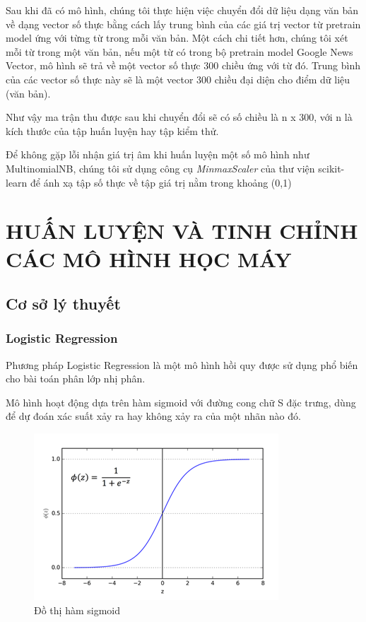 \documentclass[12pt,a4paper,oneside]{book}
\begin{document}
	Sau khi đã có mô hình, chúng tôi thực hiện việc chuyển đổi dữ liệu dạng văn bản về dạng vector số thực bằng cách lấy trung bình của các giá trị vector từ pretrain model ứng với từng từ trong mỗi văn bản. Một cách chi tiết hơn, chúng tôi xét mỗi từ trong một văn bản, nếu một từ có trong bộ pretrain model Google News Vector, mô hình sẽ trả về một vector số thực 300 chiều ứng với từ đó. Trung bình của các vector số thực này sẽ là một vector 300 chiều đại diện cho điểm dữ liệu (văn bản).
	
	Như vậy ma trận thu được sau khi chuyển đổi sẽ có số chiều là n x 300, với n là kích thước của tập huấn luyện hay tập kiểm thử.
	
	Để không gặp lỗi nhận giá trị âm khi huấn luyện một số mô hình như MultinomialNB, chúng tôi sử dụng công cụ \textit{MinmaxScaler} của thư viện scikit-learn để ánh xạ tập số thực về tập giá trị nằm trong khoảng (0,1)

\chapter{HUẤN LUYỆN VÀ TINH CHỈNH CÁC MÔ HÌNH HỌC MÁY}
	\section{Cơ sở lý thuyết}
		\subsection{Logistic Regression}
			Phương pháp Logistic Regression là một mô hình hồi quy được sử dụng phổ biến cho bài toán phân lớp nhị phân.

			Mô hình hoạt động dựa trên hàm sigmoid với đường cong chữ S đặc trưng, dùng để dự đoán xác suất xảy ra hay không xảy ra của một nhãn nào đó.
			
			\begin{figure}[H]
				\begin{center}
					\includegraphics[width=0.8\columnwidth]{Picture1}
				\end{center}
				\caption{Đồ thị hàm sigmoid}
			\end{figure}
			
\end{document}
